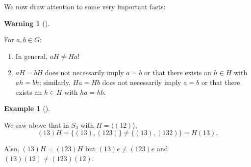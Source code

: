 \documentclass[10pt,]{book}
\theoremstyle{plain}
\theoremstyle{definition}
\theoremstyle{definition}
\newtheorem{warning}[theorem]{Warning}
\theoremstyle{definition}
\newtheorem{example}[theorem]{Example}
\theoremstyle{definition}
\numberwithin{equation}{section}
\begin{document}
    We now draw attention to some very important facts:
\begin{warning}[]\label{warning-20}

      For \(a,b\in G\):
      \leavevmode%
\begin{enumerate}
\item\hypertarget{li-412}{}
            In general, \(aH \neq Ha\)!
\item\hypertarget{li-413}{}
            \(aH=bH\) does not necessarily imply \(a=b\) or that there exists
            an \(h\in H\) with \(ah=bh\); similarly, \(Ha=Hb\) does not necessarily
            imply \(a=b\) or that there exists an \(h\in H\) with
            \(ha=hb\).
\end{enumerate}

\end{warning}
\begin{example}[]\label{example-72}

        We saw above that in \(S_3\) with \(H=\langle (12)\rangle\),
\begin{equation*}

          (13)H=\{(13),(123)\} \neq \{(13),(132)\}=H(13).
        
\end{equation*}

\par

        Also,
        \((13)H=(123)H\) but \((13)e\neq (123)e\) and \((13)(12)\neq (123)(12)\).
\end{example}
\par
\end{document}
